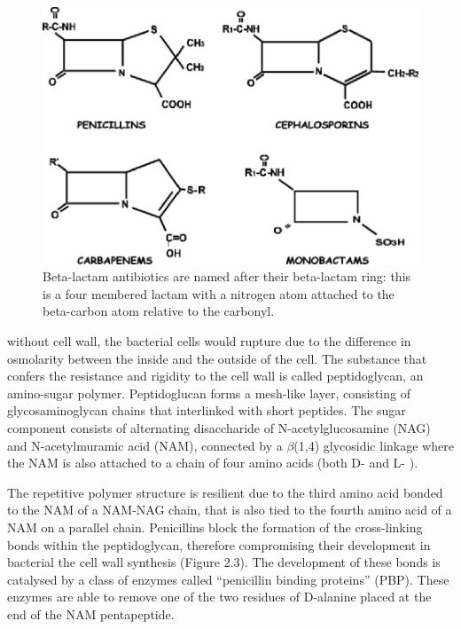 \documentclass[11pt]{report}
\begin{document}
\clearpage
\begin{figure}[htp]
\centering
\includegraphics[scale=0.35]{img/beta_lacatams.jpg}
\caption{Beta-lactam antibiotics are named after their beta-lactam ring: this is a four membered lactam with a nitrogen atom attached to the beta-carbon atom relative to the carbonyl.}
\label{}
\end{figure}

without cell wall, the bacterial cells would rupture due to the difference in osmolarity between the inside and the outside of the cell.
The substance that confers the resistance and rigidity to the cell wall is called peptidoglycan, an amino-sugar polymer.
Peptidoglucan forms a mesh-like layer, consisting of glycosaminoglycan chains that interlinked with short peptides.
The sugar component consists of alternating disaccharide of N-acetylglucosamine (NAG) and N-acetylmuramic acid (NAM), connected by a $\beta$(1,4) glycosidic linkage where the NAM is also attached to a chain of four amino acids (both D- and L- ).

The repetitive polymer structure is resilient due to the third amino acid bonded to the NAM of a NAM-NAG chain, that is also tied to the fourth amino acid of a NAM on a parallel chain.
Penicillins block the formation of the cross-linking bonds within the peptidoglycan, therefore compromising their development in bacterial the cell wall synthesis (Figure 2.3).
The development of these bonds is catalysed by a class of enzymes called “penicillin binding proteins” (PBP).
These enzymes are able to remove one of the two residues of D-alanine placed at the end of the NAM pentapeptide.
\end{document}
